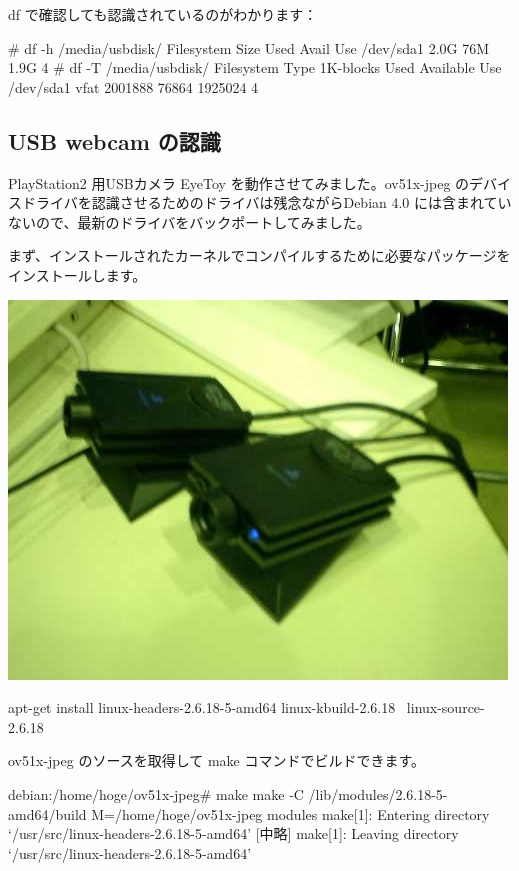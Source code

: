 \documentclass[mingoth,a4paper]{jsarticle}
\begin{document}
df で確認しても認識されているのがわかります：

\begin{commandline}
# df -h /media/usbdisk/
Filesystem            Size  Used Avail Use%
/dev/sda1             2.0G   76M  1.9G   4%
# df -T /media/usbdisk/
Filesystem    Type   1K-blocks      Used Available Use%
/dev/sda1     vfat     2001888     76864   1925024   4%
\end{commandline}

\subsection{USB webcam の認識}

\begin{multicols}{2}

 PlayStation2 用USBカメラ EyeToy を動作させてみました。ov51x-jpeg のデバイ
 スドライバを認識させるためのドライバは残念ながらDebian 4.0 には含まれてい
 ないので、最新のドライバをバックポートしてみました。

 まず、インストールされたカーネルでコンパイルするために必要なパッケージを
 インストールします。

   \includegraphics[width=0.8\hsize]{image200710/eyetoy.jpg}

\end{multicols}

\begin{commandline}
apt-get install linux-headers-2.6.18-5-amd64 linux-kbuild-2.6.18 \
 linux-source-2.6.18
\end{commandline}

ov51x-jpeg のソースを取得して make コマンドでビルドできます。

\begin{commandline}
debian:/home/hoge/ov51x-jpeg# make 
make -C /lib/modules/2.6.18-5-amd64/build M=/home/hoge/ov51x-jpeg modules
make[1]: Entering directory `/usr/src/linux-headers-2.6.18-5-amd64'
[中略]
make[1]: Leaving directory `/usr/src/linux-headers-2.6.18-5-amd64'
 
\end{commandline}
\end{document}
